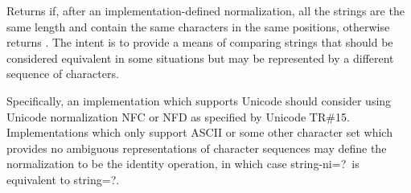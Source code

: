 \begin{entry}{%
}

Returns \schtrue{} if, after an implementation-defined normalization,
all the strings are the same length and contain the same characters in
the same positions, otherwise returns \schfalse.  The intent is to
provide a means of comparing strings that should be considered
equivalent in some situations but may be represented by a different
sequence of characters.

Specifically, an implementation which
supports Unicode should consider using Unicode normalization NFC or
NFD as specified by Unicode TR\#15.  Implementations which only
support ASCII or some other character set which provides no ambiguous
representations of character sequences may define the normalization to
be the identity operation, in which case {\cf string-ni=?}\ is
equivalent to {\cf string=?}.

\end{entry}


